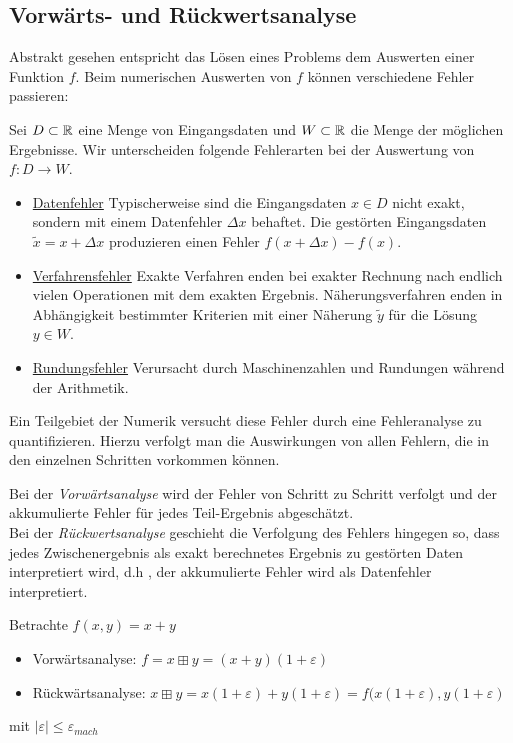 \subsection{Vorwärts- und Rückwertsanalyse}
Abstrakt gesehen entspricht das Lösen eines Problems dem Auswerten einer Funktion $f$.
Beim numerischen Auswerten von $f$ können verschiedene Fehler passieren:

\begin{definition}[Fehlerarten]
Sei $D \subset \mathbb{R}$ eine Menge von Eingangsdaten und $W \subset \mathbb{R}$ die Menge der möglichen Ergebnisse. Wir unterscheiden folgende Fehlerarten bei der Auswertung von $f \colon D \to W$.
\begin{itemize}
\item \underline{Datenfehler} Typischerweise sind die Eingangsdaten $x \in D$ nicht exakt,
sondern mit einem Datenfehler $\Delta x$ behaftet. Die gestörten Eingangsdaten $\tilde{x}=x+ \Delta x$ produzieren einen Fehler $f(x+\Delta x)-f(x)$.
\item \underline{Verfahrensfehler} Exakte Verfahren enden bei exakter Rechnung nach endlich vielen Operationen mit dem exakten Ergebnis.
Näherungsverfahren enden in Abhängigkeit bestimmter Kriterien mit einer Näherung $\tilde{y}$ für die Lösung $y \in W$.
\item \underline{Rundungsfehler} Verursacht durch Maschinenzahlen und Rundungen während der Arithmetik.
\end{itemize}
\end{definition}
Ein Teilgebiet der Numerik versucht diese Fehler durch eine Fehleranalyse zu quantifizieren.
Hierzu verfolgt man die Auswirkungen von allen Fehlern, die in den einzelnen Schritten vorkommen können.
\begin{definition}[Analysearten]
Bei der \emph{Vorwärtsanalyse} wird der Fehler von Schritt zu Schritt verfolgt und der akkumulierte Fehler für jedes Teil-Ergebnis abgeschätzt. \\
Bei der \emph{Rückwertsanalyse} geschieht die Verfolgung des Fehlers hingegen so, dass jedes Zwischenergebnis als exakt berechnetes Ergebnis zu gestörten Daten interpretiert wird, d.h , der akkumulierte Fehler wird als Datenfehler interpretiert.
\end{definition}
\begin{example}
Betrachte $f(x,y)=x+y$ \\
\begin{itemize}
	\item Vorwärtsanalyse: $\boxed{f} = x \boxplus y= (x+y)(1+\varepsilon)$
	\item Rückwärtsanalyse: $x \boxplus y= x(1+\varepsilon)+y(1+\varepsilon)= f(x(1+\varepsilon), y(1+\varepsilon)$
\end{itemize}
mit $|\varepsilon|\le \varepsilon_{mach}$
\end{example}
